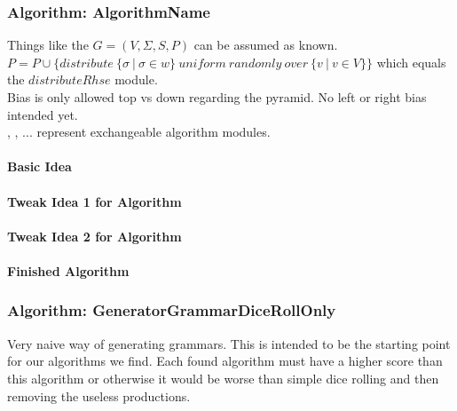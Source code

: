 \pagebreak

\subsubsection{Algorithm: AlgorithmName}
\noindent Things like the $G=(V,\Sigma , S, P)$ can be assumed as known.\\
$P = P \cup \{distribute\ \{\sigma\ |\ \sigma \in w \}\ uniform\ randomly\ over\ \{v\ |\ v \in V \} \}$ which equals the $distributeRhse$ module.\\
\noindent Bias is only allowed top vs down regarding the pyramid. No left or right bias intended yet.\\
, , ... represent exchangeable algorithm modules. 

\paragraph{Basic Idea}

\paragraph{Tweak Idea 1 for Algorithm}

\paragraph{Tweak Idea 2 for Algorithm}

\paragraph{Finished Algorithm}



\pagebreak

\subsubsection{Algorithm: GeneratorGrammarDiceRollOnly}
\noindent Very naive way of generating grammars. This is intended to be the starting point for our algorithms we find. Each found algorithm must have a higher score than this algorithm or otherwise it would be worse than simple dice rolling and then removing the useless productions.\\

